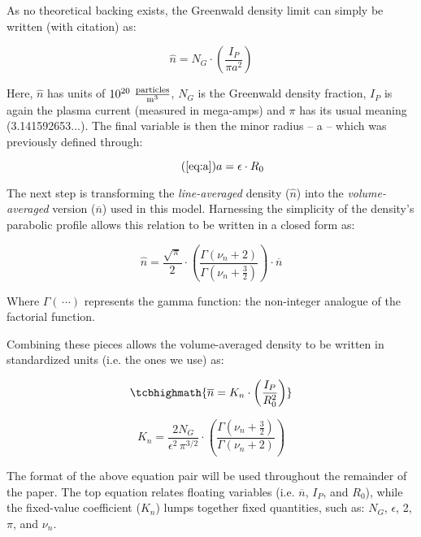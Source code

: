 As no theoretical backing exists, the Greenwald density limit can simply be written (with citation) as: \cite{greenwald}

\begin{equation}
	\hat n = N_G \cdot \left( \frac{ I_P }{ \pi a^2} \right)
\end{equation}

Here, $\hat n$ has units of $10^{20} \ \frac{\textnormal{particles}}{\textnormal{m}^3}$, $N_G$ is the Greenwald density fraction, $I_P$ is again the plasma current (measured in mega-amps) and $\pi$ has its usual meaning (3.141592653...). The final variable is then the minor radius -- a -- which was previously defined through:

\begin{equation}
	\tag{\ref{eq:a}}
	a = \epsilon \cdot R_0
\end{equation}

The next step is transforming the \emph{line-averaged} density ($\hat n$) into the \emph{volume-averaged} version ($\overline n$) used in this model. Harnessing the simplicity of the density's parabolic profile allows this relation to be written in a closed form as:
 
 \begin{equation}
 	\hat n = \frac{\sqrt{\pi}}{2} \cdot \left( \frac{\Gamma \left( \nu_n + 2 \right)}{\Gamma \left( \nu_n + \frac{3}{2} \right)} \right) \cdot \overline n 
 \end{equation}
 
 Where $\Gamma( \, \cdots)$ represents the gamma function: the non-integer analogue of the factorial function.
 
 Combining these pieces allows the volume-averaged density to be written in standardized units (i.e. the ones we use) as:
 
 \begin{equation}
 	\label{eq:greenwald}
 	\tcbhighmath{
 	\overline n = K_n \cdot \left( \frac{I_P}{R_0^2} \right)
 	}
 \end{equation}
 
 \begin{equation}
 	K_n = \frac{2 N_G}{\epsilon^2 \, \pi^{3/2} } \cdot \left( \frac{\Gamma \left( \nu_n + \frac{3}{2} \right)}{\Gamma \left( \nu_n + 2 \right)} \right)
\end{equation}
 
The format of the above equation pair will be used throughout the remainder of the paper. The top equation relates floating variables (i.e. $\overline n$, $I_P$, and $R_0$), while the fixed-value coefficient ($K_n$) lumps together fixed quantities, such as: $N_G$, $\epsilon$, 2, $\pi$, and $\nu_n$.

